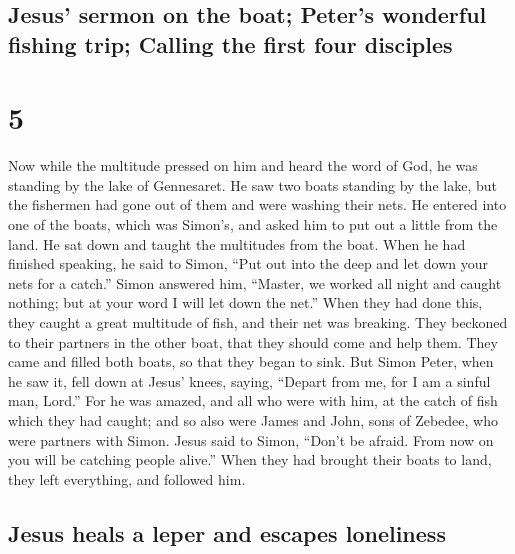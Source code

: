 \hypertarget{jesus-sermon-on-the-boat-peters-wonderful-fishing-trip-calling-the-first-four-disciples}{%
\subsection{Jesus' sermon on the boat; Peter's wonderful fishing trip;
Calling the first four
disciples}\label{jesus-sermon-on-the-boat-peters-wonderful-fishing-trip-calling-the-first-four-disciples}}

\hypertarget{section-4}{%
\section{5}\label{section-4}}

 Now while the multitude pressed on him and heard the word
of God, he was standing by the lake of Gennesaret.  He saw
two boats standing by the lake, but the fishermen had gone out of them
and were washing their nets.  He entered into one of the
boats, which was Simon's, and asked him to put out a little from the
land. He sat down and taught the multitudes from the boat.
 When he had finished speaking, he said to Simon, ``Put
out into the deep and let down your nets for a catch.'' 
Simon answered him, ``Master, we worked all night and caught nothing;
but at your word I will let down the net.''  When they had
done this, they caught a great multitude of fish, and their net was
breaking.  They beckoned to their partners in the other
boat, that they should come and help them. They came and filled both
boats, so that they began to sink.  But Simon Peter, when
he saw it, fell down at Jesus' knees, saying, ``Depart from me, for I am
a sinful man, Lord.''  For he was amazed, and all who were
with him, at the catch of fish which they had caught; 
and so also were James and John, sons of Zebedee, who were partners with
Simon. Jesus said to Simon, ``Don't be afraid. From now on you will be
catching people alive.''  When they had brought their
boats to land, they left everything, and followed him.

\hypertarget{jesus-heals-a-leper-and-escapes-loneliness}{%
\subsection{Jesus heals a leper and escapes
loneliness}\label{jesus-heals-a-leper-and-escapes-loneliness}}

